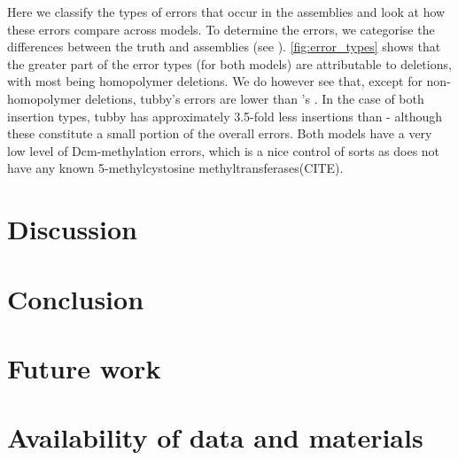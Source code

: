 Here we classify the types of errors that occur in the  assemblies and look at how these errors compare across models. To determine the errors, we categorise the differences between the truth and  assemblies (see ). \autoref{fig:error_types} shows that the greater part of the error types (for both models) are attributable to deletions, with most being homopolymer deletions. We do however see that, except for non-homopolymer deletions, tubby's errors are lower than \guppy{}'s . In the case of both insertion types, tubby has approximately 3.5-fold less insertions than \guppy{} - although these constitute a small portion of the overall errors. Both models have a very low level of Dcm-methylation errors, which is a nice control of sorts as \mtb{} does not have any known 5-methylcystosine methyltransferases(CITE).


\section{Discussion}

\section{Conclusion}

\section{Future work}

\section{Availability of data and materials}